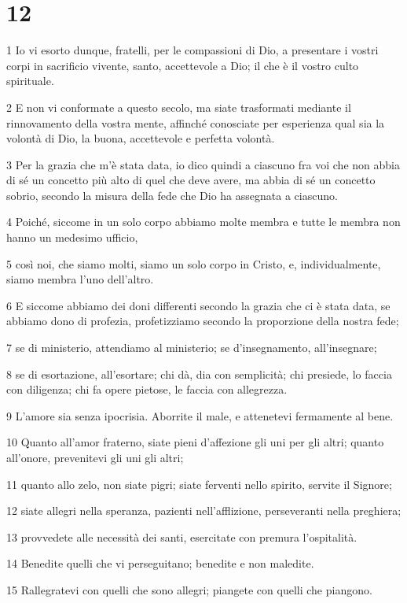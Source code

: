 \chapter{12}

\par 1 Io vi esorto dunque, fratelli, per le compassioni di Dio, a presentare i vostri corpi in sacrificio vivente, santo, accettevole a Dio; il che è il vostro culto spirituale.
\par 2 E non vi conformate a questo secolo, ma siate trasformati mediante il rinnovamento della vostra mente, affinché conosciate per esperienza qual sia la volontà di Dio, la buona, accettevole e perfetta volontà.
\par 3 Per la grazia che m'è stata data, io dico quindi a ciascuno fra voi che non abbia di sé un concetto più alto di quel che deve avere, ma abbia di sé un concetto sobrio, secondo la misura della fede che Dio ha assegnata a ciascuno.
\par 4 Poiché, siccome in un solo corpo abbiamo molte membra e tutte le membra non hanno un medesimo ufficio,
\par 5 così noi, che siamo molti, siamo un solo corpo in Cristo, e, individualmente, siamo membra l'uno dell'altro.
\par 6 E siccome abbiamo dei doni differenti secondo la grazia che ci è stata data, se abbiamo dono di profezia, profetizziamo secondo la proporzione della nostra fede;
\par 7 se di ministerio, attendiamo al ministerio; se d'insegnamento, all'insegnare;
\par 8 se di esortazione, all'esortare; chi dà, dia con semplicità; chi presiede, lo faccia con diligenza; chi fa opere pietose, le faccia con allegrezza.
\par 9 L'amore sia senza ipocrisia. Aborrite il male, e attenetevi fermamente al bene.
\par 10 Quanto all'amor fraterno, siate pieni d'affezione gli uni per gli altri; quanto all'onore, prevenitevi gli uni gli altri;
\par 11 quanto allo zelo, non siate pigri; siate ferventi nello spirito, servite il Signore;
\par 12 siate allegri nella speranza, pazienti nell'afflizione, perseveranti nella preghiera;
\par 13 provvedete alle necessità dei santi, esercitate con premura l'ospitalità.
\par 14 Benedite quelli che vi perseguitano; benedite e non maledite.
\par 15 Rallegratevi con quelli che sono allegri; piangete con quelli che piangono.
